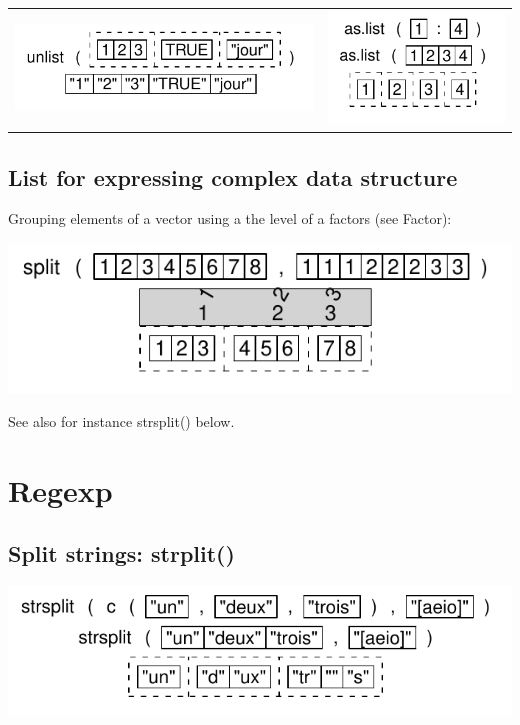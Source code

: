 \documentclass[pdflatex]{article}
\begin{document}
\begin{tabular}{cc}
\includegraphics{unlist} & \includegraphics{aslist}
\end{tabular}

\subsection{List for expressing complex data structure}

Grouping elements of a vector using a the level of a factors (see Factor):

\includegraphics{split}

See also for instance strsplit() below.

\section{Regexp}

\subsection{Split strings: strplit()}

\includegraphics{strsplit.pdf}
\end{document}
